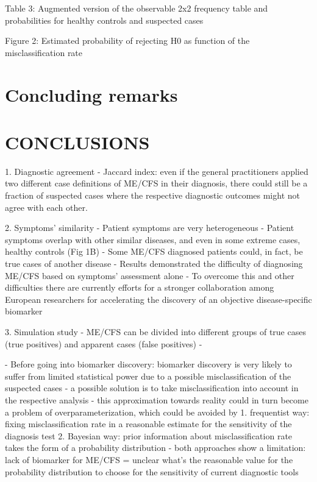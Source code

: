 Table 3: Augmented version of the observable 2x2 frequency table and probabilities for healthy controls and suspected cases

Figure 2: Estimated probability of rejecting H0 as function of the misclassification rate


\section{Concluding remarks}


\section{CONCLUSIONS}

1. Diagnostic agreement
    - Jaccard index: even if the general practitioners applied two different case definitions of ME/CFS in their diagnosis, there could still be a fraction of suspected cases where the respective diagnostic outcomes might not agree with each other.

2. Symptoms' similarity
    - Patient symptoms are very heterogeneous
    - Patient symptoms overlap with other similar diseases, and even in some extreme cases, healthy controls (Fig 1B)
    - Some ME/CFS diagnosed patients could, in fact, be true cases of another disease \citep{nacul2019HowHave}
    - Results demonstrated the difficulty of diagnosing ME/CFS based on symptoms' assessment alone
        - To overcome this and other difficulties there are currently efforts for a stronger collaboration among European researchers for accelerating the discovery of an objective disease-specific biomarker \citep{scheibenbogen2017EuropeanME}

3. Simulation study
    - ME/CFS can be divided into different groups of true cases (true positives) and apparent cases (false positives)
    - 

- Before going into biomarker discovery: biomarker discovery is very likely to suffer from limited statistical power due to a possible misclassification of the suspected cases
    - a possible solution is to take misclassification into account in the respective analysis
    - this approximation towards reality could in turn become a problem of overparameterization, which could be avoided by
        1. frequentist way: fixing misclassification rate in a reasonable estimate for the sensitivity of the diagnosis test
        2. Bayesian way: prior information about misclassification rate takes the form of a probability distribution
        - both approaches show a limitation: lack of biomarker for ME/CFS = unclear what's the reasonable value for the probability distribution to choose for the sensitivity of current diagnostic tools
    